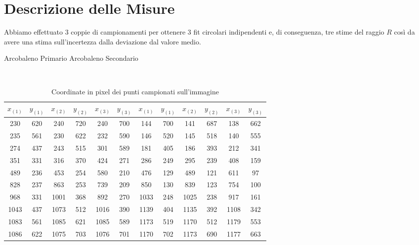 \documentclass{report}[a4paper,11pt]
\begin{document}
\section{Descrizione delle Misure}
Abbiamo effettuato $3$ coppie di campionamenti per ottenere $3$ fit circolari indipendenti e, di conseguenza, tre stime del raggio $R$ così da avere una stima sull'incertezza dalla deviazione dal valore medio.
\begin{table}[!htb]
  \begin{center}
  \begin{large}
  Arcobaleno Primario  \qquad \qquad \qquad \space Arcobaleno Secondario
  \end{large}\\
	\begin{tabular}{cccccc|cccccc}
	\toprule
	$x_{(1)}$  & $y_{(1)}$  & $x_{(2)}$  & $y_{(2)}$  & $x_{(3)}$  & $y_{(3)}$  & $x_{(1)}$  & $y_{(1)}$  & $x_{(2)}$  & $y_{(2)}$  & $x_{(3)}$  & $y_{(3)}$  \\
	\midrule
	\midrule
	230 & 620 & 240 & 720 & 240 & 700 & 144 & 700 & 141 & 687 & 138 & 662 \\ 
	 
	235 & 561 & 230 & 622 & 232 & 590 & 146 & 520 & 145 & 518 & 140 & 555 \\ 
	 
	274 & 437 & 243 & 515 & 301 & 589 & 181 & 405 & 186 & 393 & 212 & 341 \\ 
	 
	351 & 331 & 316 & 370 & 424 & 271 & 286 & 249 & 295 & 239 & 408 & 159 \\ 
	 
	489 & 236 & 453 & 254 & 580 & 210 & 476 & 129 & 489 & 121 & 611 & 97 \\ 
	 
	828 & 237 & 863 & 253 & 739 & 209 & 850 & 130 & 839 & 123 & 754 & 100 \\ 
	 
	968 & 331 & 1001 & 368 & 892 & 270 & 1033 & 248 & 1025 & 238 & 917 & 161 \\ 
	 
	1043 & 437 & 1073 & 512 & 1016 & 390 & 1139 & 404 & 1135 & 392 & 1108 & 342 \\ 
	 
	1083 & 561 & 1085 & 621 & 1085 & 589 & 1173 & 519 & 1170 & 512 & 1179 & 553 \\ 
	 
	1086 & 622 & 1075 & 703 & 1076 & 701 & 1170 & 702 & 1173 & 690 & 1177 & 663 \\ 
	\bottomrule
	\end{tabular}
  \end{center}
  \caption{Coordinate in pixel dei punti campionati sull'immagine\label{tab:arcpoints}}
\end{table}
\end{document}
